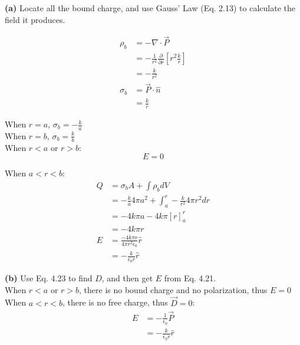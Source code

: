 \documentclass{article}
\begin{document}
\textbf{(a)}
Locate all the bound charge, and use Gauss' Law (Eq. 2.13) to calculate the field it produces.

\begin{equation*}
\begin{split}
	\rho_b & = - \nabla \cdot \vec{P} \\
	& = - \frac{1}{r^2} \frac{\partial}{\partial r} [r^2 \frac{k}{r}] \\
	& = - \frac{k}{r^2} \\
	\sigma_b & = \vec{P} \cdot \hat{n} \\
	& = \frac{k}{r}
\end{split}
\end{equation*}

When $r = a$, $\sigma_b = - \frac{k}{a}$ \\

When $r = b$, $\sigma_b = \frac{k}{b}$ \\

When $r < a$ or $r > b$:
$$E = \boxed{0}$$

When $a < r < b$:
\begin{equation*}
\begin{split}
	Q & = \sigma_b A + \int \rho_b dV \\
	& = - \frac{k}{a} 4 \pi a^2 + \int_a^r - \frac{k}{r^2} 4 \pi r^2 dr \\
	& = - 4 k \pi a - 4 k \pi [r]^r_a \\
	& = - 4 k \pi r \\
	E & = \frac{- 4 k \pi r}{4 \pi r^2 \epsilon_0} \hat{r} \\
	& = \boxed{- \frac{k}{\epsilon_0 r} \hat{r}}
\end{split}
\end{equation*}

\textbf{(b)}
Use Eq. 4.23 to find $D$, and then get $E$ from Eq. 4.21. \\

When $r < a$ or $r > b$, there is no bound charge and no polarization, thus $E = \boxed{0}$ \\

When $a < r < b$, there is no free charge, thus $\vec{D} = 0$:
\begin{equation*}
\begin{split}
	E & = - \frac{1}{\epsilon_0} \vec{P} \\
	& = \boxed{- \frac{k}{\epsilon_0 r} \hat{r}}
\end{split}
\end{equation*}
\end{document}
